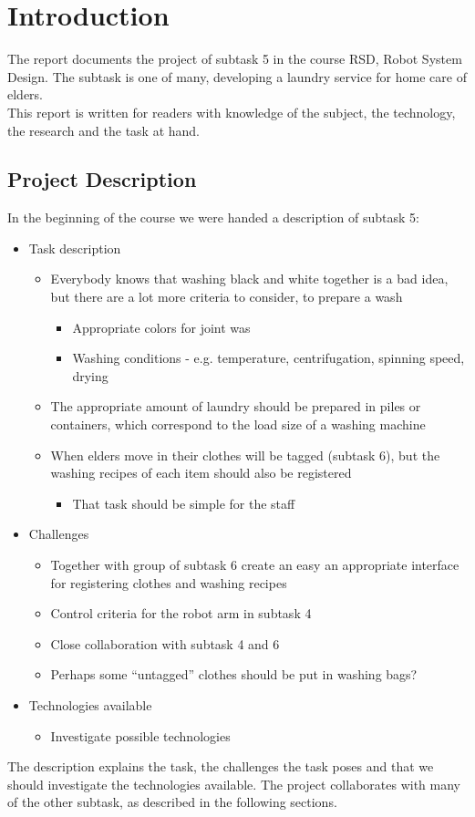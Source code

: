 \section{Introduction}

The report documents the project of subtask 5 in the course RSD, Robot System Design. The subtask is one of many, developing a laundry service for home care of elders. \\ This report is written for readers with knowledge of the subject, the technology, the research and the task at hand.

\subsection{Project Description}

In the beginning of the course we were handed a description of subtask 5:

\begin{itemize}
\item Task description
	\begin{itemize}
	\item Everybody knows that washing black and white together is a bad idea, but there are a lot more criteria to consider, to prepare a wash
		\begin{itemize}
		\item Appropriate colors for joint was
		\item Washing conditions - e.g. temperature, centrifugation, spinning speed, drying
		\end{itemize}
	\item The appropriate amount of laundry should be prepared in piles or containers, which correspond to the load size of a washing machine
	\item When elders move in their clothes will be tagged (subtask 6), but the washing recipes of each item should also be registered
		\begin{itemize}
		\item That task should be simple for the staff
		\end{itemize}
	\end{itemize}
\item Challenges
	\begin{itemize}
	\item Together with group of subtask 6 create an easy an appropriate interface for registering clothes and washing recipes
	\item Control criteria for the robot arm in subtask 4
	\item Close collaboration with subtask 4 and 6
	\item Perhaps some “untagged” clothes should be put in washing bags?
	\end{itemize}
\item Technologies available
	\begin{itemize}
	\item Investigate possible technologies
	\end{itemize}
\end{itemize}

The description explains the task, the challenges the task poses and that we should investigate the technologies available. The project collaborates with many of the other subtask, as described in the following sections.